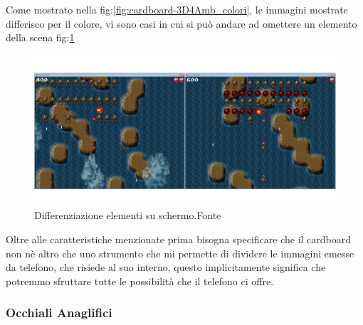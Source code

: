 \documentclass[10pt,a4paper]{article}
\begin{document}
    Come mostrato nella fig:\ref{fig:cardboard-3D4Amb_colori}, le immagini mostrate differisco per il colore, vi sono casi in cui si può andare ad omettere un elemento della scena fig:\ref{fig:cardboard-3D4Amb_elementi}
    	\begin{figure}[H]
    	\centering
    	\includegraphics[width=0.8\linewidth]{image/3D4Amb_2}
    	\caption{Differenziazione elementi su schermo.Fonte\cite{3d4amb_image}}
    	\label{fig:cardboard-3D4Amb_elementi}
    \end{figure}
    Oltre alle caratteristiche menzionate prima bisogna specificare che il cardboard non nè altro che uno strumento che mi permette di dividere le immagini emesse da telefono, che risiede al suo interno, questo implicitamente significa che potremmo sfruttare tutte le possibilità che il telefono ci offre.

	\subsubsection{Occhiali Anaglifici}\label{chap:occhiali_anaglifici}
\end{document}
